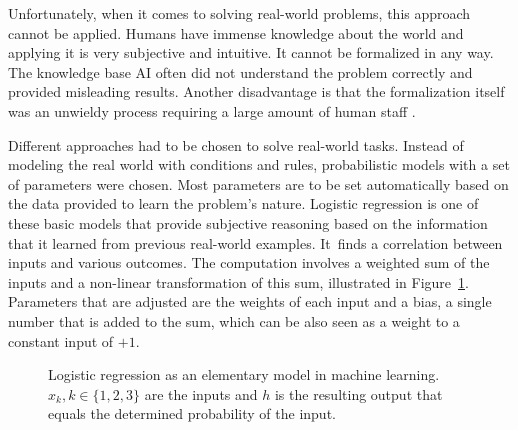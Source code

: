 Unfortunately, when it comes to solving real-world problems, this approach cannot be applied. Humans have immense knowledge about the world and applying it is very subjective and intuitive. It cannot be formalized in any way. The knowledge base AI often did not understand the problem correctly and provided misleading results. Another disadvantage is that the formalization itself was an unwieldy process requiring a large amount of human staff \cite{Goodfellow-et-al-2016}.

Different approaches had to be chosen to solve real-world tasks. Instead of modeling the real world with conditions and rules, probabilistic models with a set of parameters were chosen. Most parameters are to be set automatically based on the data provided to learn the problem's nature. Logistic regression is one of these basic models that provide subjective reasoning based on the information that it learned from previous real-world examples. It~finds a correlation between inputs and various outcomes. The computation involves a weighted sum of the inputs and a non-linear transformation of this sum, illustrated in Figure~\ref{fig:neuron}. Parameters that are adjusted are the weights of each input and a bias, a single number that is added to the sum, which can be also seen as a weight to a constant input of $+1$.

\begin{figure}[!ht]
    \centering
    \caption{Logistic regression as an elementary model in machine learning. $x_{k}, k \in \{1, 2, 3\}$ are the inputs and $h$ is the resulting output that equals the determined probability of the input.}
    \label{fig:neuron}
\end{figure}

